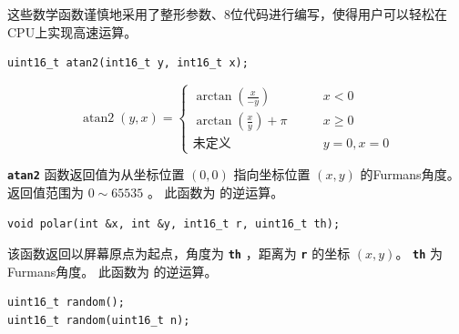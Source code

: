 \documentclass[10pt]{book}
\newcommand{\mach}[1]{\texttt{\textbf{#1}}}
\begin{document}
\begin{CJK}{UTF8}{gkai}
这些数学函数谨慎地采用了整形参数、8位代码进行编写，使得用户可以轻松在CPU上实现高速运算。



\begin{framed}
\begin{verbatim}
uint16_t atan2(int16_t y, int16_t x);
\end{verbatim}
\end{framed}

\[
\operatorname{atan2}(y, x) = \begin{cases}
\arctan\left(\frac x {-y} \right) & \qquad x < 0 \\
\arctan\left(\frac x y \right) + \pi& \qquad x \ge 0 \\
\text{未定义} & \qquad y = 0, x = 0
\end{cases}
\]

\mach{atan2} 函数返回值为从坐标位置 $(0,0)$ 指向坐标位置 $(x, y)$ 的Furmans角度。
返回值范围为 $0\sim65535$ 。
此函数为  的逆运算。
\newpage


\begin{framed}
\begin{verbatim}
void polar(int &x, int &y, int16_t r, uint16_t th);
\end{verbatim}
\end{framed}

\begin{center}
\end{center}

该函数返回以屏幕原点为起点，角度为 \mach{th} ，距离为 \mach{r} 的坐标 $(x,y)$。
\mach{th} 为Furmans角度。
此函数为  的逆运算。


\begin{framed}
\begin{verbatim}
uint16_t random();
uint16_t random(uint16_t n);
\end{verbatim}
\end{framed}


\end{CJK}
\end{document}

